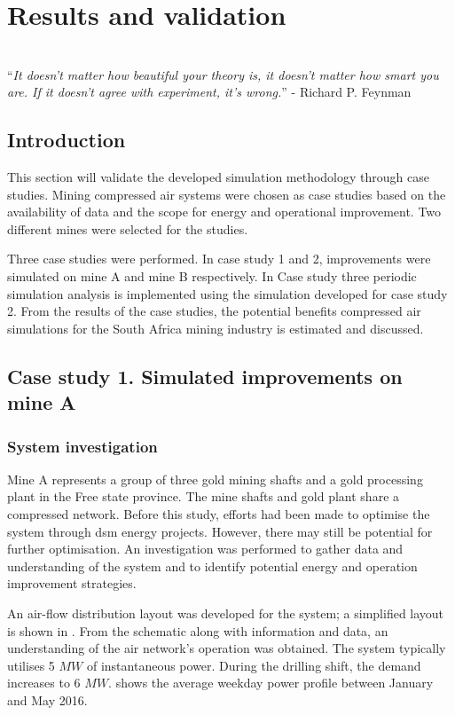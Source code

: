 \chapter{Results and validation}
\thispagestyle{empty}
\vspace{40em}
\hrulefill \\
\enquote{\textit{It doesn't matter how beautiful your theory is, it doesn't matter how smart you are. If it doesn't agree with experiment, it's wrong.}} - Richard P. Feynman\\
\newpage
\section{Introduction}
This section will validate the developed simulation methodology through case studies. Mining compressed air systems were chosen as case studies based on the availability of data and the scope for energy and operational improvement. Two different mines were selected for the studies. 
\par 
Three case studies were performed. In case study 1 and 2, improvements were simulated on mine A and mine B respectively. In Case study three periodic simulation analysis is implemented using the simulation developed for case study 2. From the results of the case studies, the potential benefits compressed air simulations for the South Africa mining industry is estimated and discussed.

\section{Case study 1. Simulated improvements on mine A}
\subsection{System investigation}
Mine A represents a group of three gold mining shafts and a gold processing plant in the Free state province. The mine shafts and gold plant share a compressed network. Before this study, efforts had been made to optimise the system through \gls{dsm} energy projects. However, there may still be potential for further optimisation. An investigation was performed to gather data and understanding of the system and to identify potential energy and operation improvement strategies.
\par 
An air-flow distribution layout was developed for the system; a simplified layout is shown in . From the schematic along with information and data, an understanding of the air network’s operation was obtained. The system typically utilises 5 $MW$ of instantaneous power. During the drilling shift, the demand increases to 6 $MW$.  shows the average weekday power profile between January and May 2016.

